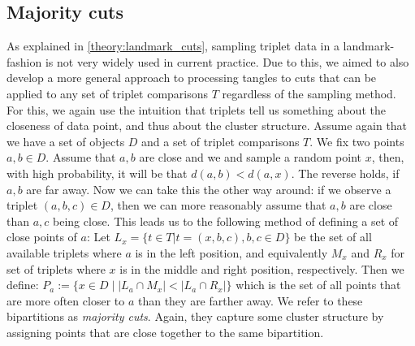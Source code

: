\subsection{Majority cuts}
As explained in \autoref{theory:landmark_cuts}, sampling triplet data in a landmark-fashion is not very widely used in current practice. Due to this, we aimed
to also develop a more general approach to processing tangles to cuts that can be applied to any set of triplet comparisons $T$ regardless of the sampling method.
For this, we again use the intuition that triplets tell us something about the closeness of data point, and thus about the cluster structure. Assume again
that we have a set of objects $D$ and a set of triplet comparisons $T$. We fix two points $a,b \in D$. Assume that $a,b$ are close and we and sample a random point $x$,
then, with high probability, it will be that $d(a,b) < d(a,x)$. The reverse holds, if $a,b$ are far away. Now we can take this the other way around: 
if we observe a triplet $(a,b,c) \in D$, then we can more reasonably assume that $a,b$ are close than $a,c$ being close. This leads us to the following method of defining
a set of close points of $a$: Let $L_x = \{t \in T | t = (x, b,c), b,c \in D\}$ be the set of all available triplets where $a$ is in the left position, and equivalently $M_x$ and $R_x$ 
for set of triplets where $x$ is in the middle and right position, respectively. Then we define: $P_a := \{x \in D \mid \left|   L_a \cap M_x\right| < \left| L_a \cap R_x \right| \}$
which is the set of all points that are more often closer to $a$ than they are farther away. We refer to these bipartitions as \textit{majority cuts}. Again, they capture
some cluster structure by assigning points that are close together to the same bipartition.


